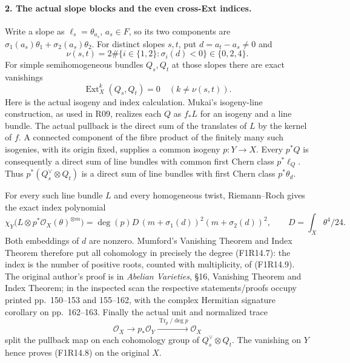 \paragraph{2. The actual slope blocks and the even cross-Ext indices.}
Write a slope as $\ell_s=\theta_{a_s}$, $a_s\in F$,
so its two components are
$\sigma_1(a_s)\theta_1+\sigma_2(a_s)\theta_2$.
For distinct slopes $s,t$, put $d=a_t-a_s\ne0$ and
\[
       \nu(s,t)=2\#\{i\in\{1,2\}:\sigma_i(d)<0\}
                         \in\{0,2,4\}.
 \tag{F1R14.7}
\]
For simple semihomogeneous bundles $Q_s,Q_t$ at those
slopes there are exact vanishings
\[
            \operatorname{Ext}^k_X(Q_s,Q_t)=0
                         \quad(k\ne\nu(s,t)).
 \tag{F1R14.8}
\]
Here is the actual isogeny and index calculation. Mukai's
isogeny-line construction, as used in R09, realizes each
$Q$ as $f_*L$ for an isogeny and a line bundle. The actual
pullback is the direct sum of the translates of $L$ by
the kernel of $f$. A connected component of the fibre
product of the finitely many such isogenies, with its
origin fixed, supplies a common isogeny $p:Y\to X$.
Every $p^*Q$ is consequently a direct sum of line bundles
with common first Chern class $p^*\ell_Q$. Thus
$p^*(Q_s^\vee\otimes Q_t)$ is a direct sum of line bundles
with first Chern class $p^*\theta_d$.

For every such line bundle $L$ and every homogeneous twist,
Riemann--Roch gives the exact index polynomial
\[
 \chi_Y\bigl(L\otimes p^*\mathcal O_X(\theta)^{\otimes m}\bigr)
       =\deg(p)D\,(m+\sigma_1(d))^2(m+\sigma_2(d))^2,
       \qquad D=\int_X\theta^4/24.
 \tag{F1R14.9}
\]
Both embeddings of $d$ are nonzero. Mumford's Vanishing
Theorem and Index Theorem therefore put all cohomology
in precisely the degree (F1R14.7): the index is the number
of positive roots, counted with multiplicity, of (F1R14.9).
The original author's proof is in \emph{Abelian Varieties},
\S16, Vanishing Theorem and Index Theorem; in the inspected
scan the respective statements/proofs occupy printed
pp.~150--153 and 155--162, with the complex Hermitian
signature corollary on pp.~162--163.
Finally the actual unit and normalized trace
\[
 \mathcal O_X\longrightarrow p_*\mathcal O_Y
       \xrightarrow{\operatorname{Tr}_p/\deg p}\mathcal O_X
\]
split the pullback map on each cohomology group of
$Q_s^\vee\otimes Q_t$. The vanishing on $Y$ hence proves
(F1R14.8) on the original $X$.

